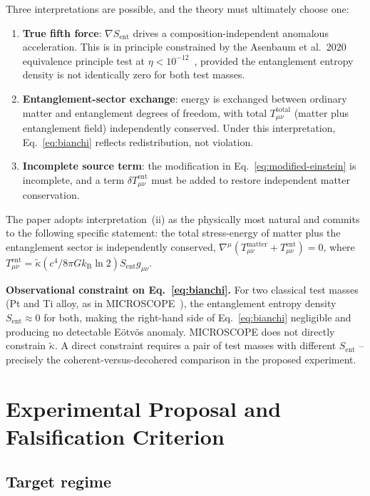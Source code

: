 \documentclass[12pt,twocolumn]{article}
\newcommand{\kB}{k_{\mathrm{B}}}
\newcommand{\kt}{\tilde{\kappa}}
\newcommand{\Sent}{S_{\mathrm{ent}}}
\begin{document}
Three interpretations are possible, and the theory must ultimately choose one:
\begin{enumerate}
\item[(i)] \textbf{True fifth force}: $\nabla\Sent$ drives a composition-independent anomalous
  acceleration. This is in principle constrained by the Asenbaum et al.\ 2020 equivalence
  principle test at $\eta < 10^{-12}$~\cite{Asenbaum2020}, provided the entanglement
  entropy density is not identically zero for both test masses.
\item[(ii)] \textbf{Entanglement-sector exchange}: energy is exchanged between ordinary matter
  and entanglement degrees of freedom, with total $T_{\mu\nu}^{\mathrm{total}}$ (matter plus
  entanglement field) independently conserved.  Under this interpretation, Eq.~\eqref{eq:bianchi}
  reflects redistribution, not violation.
\item[(iii)] \textbf{Incomplete source term}: the modification in Eq.~\eqref{eq:modified-einstein}
  is incomplete, and a term $\delta T_{\mu\nu}^{\mathrm{ent}}$ must be added to restore
  independent matter conservation.
\end{enumerate}
The paper adopts interpretation~(ii) as the physically most natural and commits to the
following specific statement: the total stress-energy of matter plus the entanglement sector
is independently conserved, $\nabla^\mu(T_{\mu\nu}^{\mathrm{matter}}
+ T_{\mu\nu}^{\mathrm{ent}}) = 0$, where $T_{\mu\nu}^{\mathrm{ent}} =
\kt(c^4/8\pi G\kB\ln 2)\Sent g_{\mu\nu}$.

\textbf{Observational constraint on Eq.~\eqref{eq:bianchi}.}
For two classical test masses (Pt and Ti alloy, as in MICROSCOPE~\cite{MICROSCOPE2022}), the
entanglement entropy density $\Sent\approx 0$ for both, making the right-hand side of
Eq.~\eqref{eq:bianchi} negligible and producing no detectable Eötvös anomaly.  MICROSCOPE
does not directly constrain $\kt$.  A direct constraint requires a pair of test masses with
different $\Sent$ -- precisely the coherent-versus-decohered comparison in the proposed
experiment.

\section{Experimental Proposal and Falsification Criterion}
\label{sec:experiment}

\subsection{Target regime}
\end{document}
